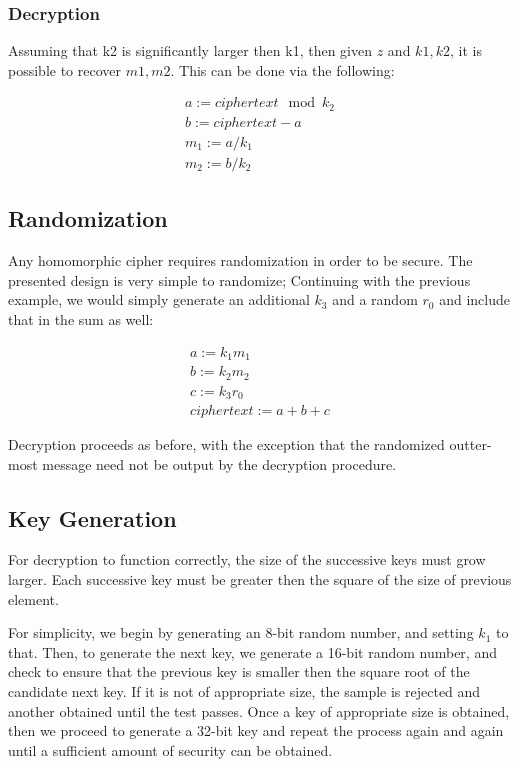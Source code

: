 \documentclass[preprint]{iacrtrans}
\begin{document}
\subsubsection{Decryption}
Assuming that k2 is significantly larger then k1, then given $z$ and $k1, k2$, it is possible to recover $m1, m2$. This can be done via the following:

\begin{align}
a := ciphertext \mod k_2\\
b := ciphertext - a\\
m_1 := a / k_1\\
m_2 := b / k_2
\end{align}

\subsection{Randomization}
Any homomorphic cipher requires randomization in order to be secure. The presented design is very simple to randomize; Continuing with the previous example, we would simply generate an additional $k_3$ and a random $r_0$ and include that in the sum as well:

\begin{align}
a := k_1 m_1\\
b := k_2 m_2\\
c := k_3 r_0\\
ciphertext := a + b + c
\end{align}

Decryption proceeds as before, with the exception that the randomized outter-most message need not be output by the decryption procedure.

\subsection{Key Generation}
For decryption to function correctly, the size of the successive keys must grow larger. Each successive key must be greater then the square of the size of previous element. 

For simplicity, we begin by generating an 8-bit random number, and setting $k_1$ to that. Then, to generate the next key, we generate a 16-bit random number, and check to ensure that the previous key is smaller then the square root of the candidate next key. If it is not of appropriate size, the sample is rejected and another obtained until the test passes. Once a key of appropriate size is obtained, then we proceed to generate a 32-bit key and repeat the process again and again until a sufficient amount of security can be obtained.
\end{document}
